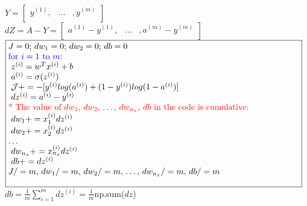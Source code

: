 \documentclass{article}
\begin{document}
$Y = \begin{bmatrix}
y^{(1)}, & \dots & , y^{(m)} \\
\end{bmatrix} $\\

$dZ = A-Y =
\begin{bmatrix}
a^{(1)} - y^{(1)}, & \dots & , a^{(m)}-y^{(m)} \\
\end{bmatrix} $\\

$\noindent\fbox{%
\parbox{\textwidth}{%
$J=0$; $dw_1 = 0$; $dw_2 = 0$; $db=0$\\

\textcolor{blue}{for $i=1$ to $m$:}\\
$\indent$ $z^{(i)} = w^T x^{(i)} + b$\\
$\indent$ $a^{(i)} = \sigma(z^{(i)})$\\
$\indent$ $\mathcal{J} += -[y^{(i)} log(a^{(i)}) + (1-y^{(i)})log(1-a^{(i)})]$\\
$\indent$ $dz^{(i)} = a^{(i)}- y^{(i)}$\\

\textcolor{red}{* The value of $dw_1$, $dw_2$, $\dots$, $dw_{n_x}$, $db$ in the code is cumulative:}\\
$\indent$ $dw_1 += x_1^{(i)}dz^{(i)}$\\
$\indent$ $dw_2 += x_2^{(i)}dz^{(i)}$\\
$\dots$\\
$\indent$ $dw_{n_x} += x_{n_x}^{(i)}dz^{(i)}$\\

$\indent$ $db += dz^{(i)}$\\

$J/=m$,  $dw_1 /=m$,  $dw_2 /=m$, \dots, $dw_{n_x} /=m$, $db /=m$\\
    }%
}$\\


$db = \frac{1}{m}\sum_{i=1}^{m}dz^{(i)} = \frac{1}{m}$np.sum($dz$)\\
\end{document}
